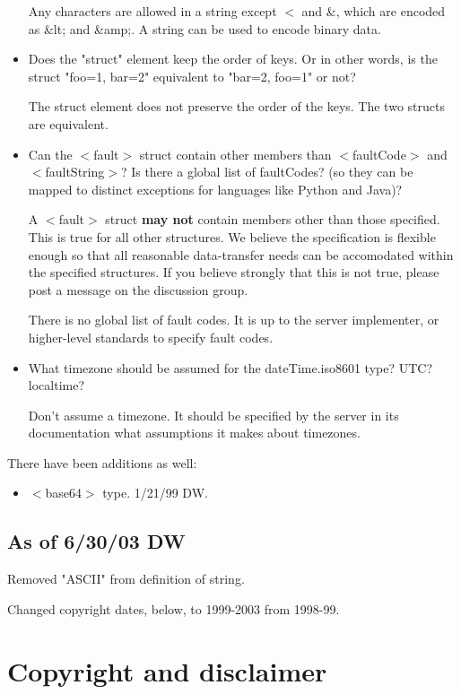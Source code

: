 \begin{itemize}
Any characters are allowed in a string except $<$ and \&, which are encoded as \&lt; and \&amp;. A string can be used to encode binary data.

\item Does the "struct" element keep the order of keys. Or in other words, is the struct "foo=1, bar=2" equivalent to "bar=2, foo=1" or not? 

The struct element does not preserve the order of the keys. The two structs are equivalent.

\item Can the $<$fault$>$ struct contain other members than $<$faultCode$>$ and $<$faultString$>$? Is there a global list of faultCodes? (so they can be mapped to distinct exceptions for languages like Python and Java)? 

A $<$fault$>$ struct \textbf{may not}
contain members other than those specified. This is true for all other structures. We believe the specification is flexible enough so that all reasonable data-transfer needs can be accomodated within the specified structures. If you believe strongly that this is not true, please post a message on the discussion group.

There is no global list of fault codes. It is up to the server implementer, or higher-level standards to specify fault codes.

\item What timezone should be assumed for the dateTime.iso8601 type? UTC? localtime? 

Don't assume a timezone. It should be specified by the server in its documentation what assumptions it makes about timezones.
\end{itemize}

There have been additions as well:
\begin{itemize}
\item $<$base64$>$ type. 1/21/99 DW.
\end{itemize}

\subsection{As of 6/30/03 DW}

Removed "ASCII" from definition of string.

Changed copyright dates, below, to 1999-2003 from 1998-99.


%
%

\section{Copyright and disclaimer}

